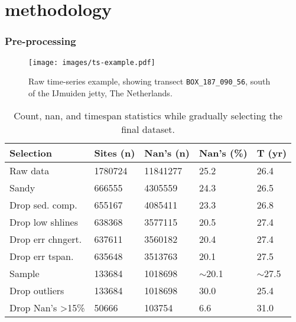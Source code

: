 \documentclass[10pt]{beamer}
\theoremstyle{remark}
\theoremstyle{definition}
\begin{document}
\section{methodology}
\begin{frame}[allowframebreaks]
	\frametitle{Pre-processing}
	
  
%	


\begin{figure}
	\centering
	\texttt{[image: images/ts-example.pdf]}
	\caption{Raw time-series example, showing transect \texttt{BOX\_187\_090\_56}, south of the IJmuiden jetty, The Netherlands.}
	\label{fig:ts-example}
\end{figure}
%
\framebreak
	\begin{table}[ht]
	\centering
	\caption{Count, nan, and timespan statistics while gradually selecting the final dataset.}
	\label{tab:data-selection}
	\begin{tabular}{lllll}
		\hline
		\textbf{Selection}           & \textbf{Sites (n)} & \textbf{Nan's (n)} & \textbf{Nan's (\%)} & \textbf{T (yr)} \\
		\hline
		Raw data                     & 1780724              & 11841277           & 25.2                & 26.4             \\
		Sandy              & 666555               & 4305559            & 24.3                & 26.5             \\
		Drop sed. comp.    & 655167               & 4085411            & 23.3                & 26.8             \\
		Drop low shlines             & 638368               & 3577115            & 20.5                & 27.4             \\
		Drop err chngert.              & 637611               & 3560182            & 20.4                & 27.4             \\
		Drop err tspan.                 & 635648               & 3513763            & 20.1                & 27.5             \\
		Sample                       & 133684               & 1018698            & $\sim$20.1          & $\sim$27.5       \\
		Drop outliers                & 133684               & 1018698            & 30.0                & 25.4             \\
		Drop Nan's \textgreater 15\% & 50666                & 103754             & 6.6                 & 31.0            \\
		\hline
	\end{tabular}
\end{table}

\end{frame}
\end{document}
